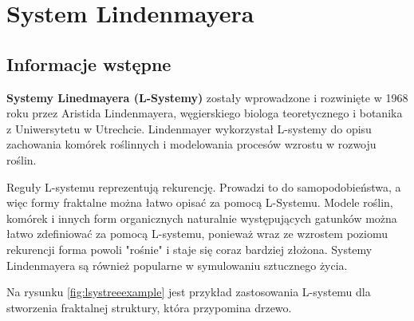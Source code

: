 \documentclass[a4paper,12pt,oneside]{book} %
\begin{document}


\chapter{System Lindenmayera} 


\section{Informacje wstępne}

\textbf{Systemy Linedmayera (L-Systemy)} zostały wprowadzone i rozwinięte w 1968 roku przez Aristida Lindenmayera,
węgierskiego biologa teoretycznego i botanika z Uniwersytetu w Utrechcie.
Lindenmayer wykorzystał L-systemy do opisu zachowania komórek roślinnych i
modelowania procesów wzrostu w rozwoju roślin.



Reguły L-systemu reprezentują rekurencję.
Prowadzi to do samopodobieństwa, a więc formy fraktalne można łatwo opisać za pomocą L-Systemu.
Modele roślin, komórek i innych form organicznych naturalnie występujących gatunków można łatwo zdefiniować za pomocą L-systemu,
ponieważ wraz ze wzrostem poziomu rekurencji forma powoli "rośnie" i staje się coraz bardziej złożona.
Systemy Lindenmayera są również popularne w symulowaniu sztucznego życia.

Na rysunku \ref{fig:lsystreeexample} jest przykład zastosowania L-systemu dla stworzenia 
fraktalnej struktury, która przypomina drzewo.
\end{document}

